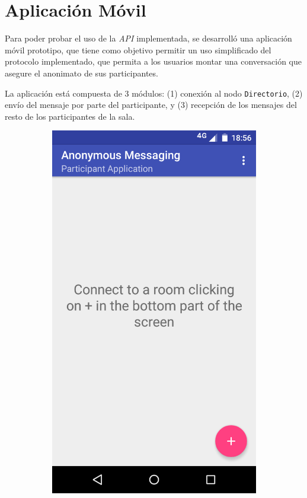 \section{Aplicación Móvil}

Para poder probar el uso de la \emph{API} implementada, se desarrolló una 
aplicación móvil prototipo, que tiene como objetivo permitir un uso 
simplificado 
del protocolo implementado, que permita a los usuarios montar una conversación 
que asegure el anonimato de sus participantes.

La aplicación está compuesta de 3 módulos: (1) conexión al nodo 
\texttt{Directorio}, (2) envío del mensaje por parte del participante, y (3) 
recepción de los mensajes del resto de los participantes de la sala.

\begin{figure}[H]
    \centering
    \begin{subfigure}[b]{0.4\textwidth}
        \includegraphics[width=\textwidth]{imagenes/mobile_first.png}

\end{subfigure}
\end{figure}
